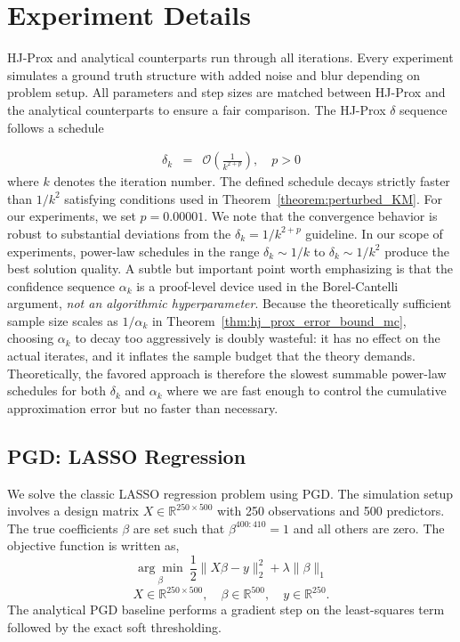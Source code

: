 \documentclass{article}
\theoremstyle{plain}
\theoremstyle{definition}
\theoremstyle{remark}
\begin{document}
\section{Experiment Details}\label{AP: Experiments}
HJ-Prox and analytical counterparts run through all iterations. Every experiment simulates a ground truth structure with added noise and blur depending on problem setup. All parameters and step sizes are matched between HJ-Prox and the analytical counterparts to ensure a fair comparison. The HJ-Prox $\delta$ sequence follows a schedule

\begin{eqnarray}
    \delta_k & = & \mathcal{O}\left(\frac{1}{k^{2 + p}}\right), \quad p>0
\end{eqnarray}
where $k$ denotes the iteration number. The defined schedule decays strictly faster than $1/k^2$ satisfying conditions used in Theorem~\ref{theorem:perturbed_KM}. For our experiments, we set  $p=0.00001$. We note that the convergence behavior is robust to substantial deviations from the $\delta_k = 1/k^{2+p}$ guideline. In our scope of experiments, power-law schedules in the range $\delta_k \sim 1/k$ to $\delta_k \sim 1/k^{2}$ produce the best solution quality. A subtle but important point worth emphasizing is that the confidence sequence $\alpha_k$ is a proof-level device used in the Borel-Cantelli argument, \emph{not an algorithmic hyperparameter}. Because the theoretically sufficient sample size scales as $1/\alpha_k$ in Theorem~\ref{thm:hj_prox_error_bound_mc}, choosing $\alpha_k$ to decay too aggressively is doubly wasteful: it has no effect on the actual iterates, and it inflates the sample budget that the theory demands. Theoretically, the favored approach is therefore the slowest summable power-law schedules for both $\delta_k$ and $\alpha_k$ where we are fast enough to control the cumulative approximation error but no faster than necessary.
\subsection{PGD: LASSO Regression}
We solve the classic LASSO regression problem using PGD. The simulation setup involves a design matrix $X \in \mathbb{R}^{250 \times 500}$ with 250 observations and 500 predictors. The true coefficients $\beta$ are set such that $\beta^{400:410} = 1$ and all others are zero. The objective function is written as,
\begin{equation}
    \underset{\beta}{\arg\min}\ \frac{1}{2}\|X\beta - y\|_2^2 + \lambda\|\beta\|_1
\end{equation}
\[
X\in\mathbb{R}^{250\times 500},\quad
\beta\in\mathbb{R}^{500},\quad
y\in\mathbb{R}^{250}.
\]
The analytical PGD baseline performs a gradient step on the least-squares term followed by the exact soft thresholding.
\end{document}
